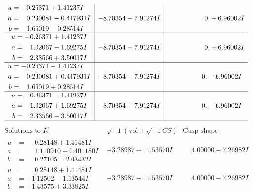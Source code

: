\documentclass[1p]{elsarticle_modified}
\theoremstyle{definition}
\newcommand{\I}{\sqrt{-1}}
\begin{document}
$$\begin{array}{c|c|c}
\begin{aligned}
u &= -0.26371 + 1.41237 I \\
a &= \phantom{-}0.230081 - 0.417931 I \\
b &= \phantom{-}1.66019 - 0.28514 I\end{aligned}
 & -8.70354 - 7.91274 I & \phantom{-0.000000 -}0. + 6.96002 I \\ \hline\begin{aligned}
u &= -0.26371 + 1.41237 I \\
a &= \phantom{-}1.02067 - 1.69275 I \\
b &= \phantom{-}2.33566 + 3.50017 I\end{aligned}
 & -8.70354 - 7.91274 I & \phantom{-0.000000 -}0. + 6.96002 I \\ \hline\begin{aligned}
u &= -0.26371 - 1.41237 I \\
a &= \phantom{-}0.230081 + 0.417931 I \\
b &= \phantom{-}1.66019 + 0.28514 I\end{aligned}
 & -8.70354 + 7.91274 I & \phantom{-0.000000 } 0. - 6.96002 I \\ \hline\begin{aligned}
u &= -0.26371 - 1.41237 I \\
a &= \phantom{-}1.02067 + 1.69275 I \\
b &= \phantom{-}2.33566 - 3.50017 I\end{aligned}
 & -8.70354 + 7.91274 I & \phantom{-0.000000 } 0. - 6.96002 I\\
 \hline 
 \end{array}$$\newpage$$\begin{array}{c|c|c}  
\text{Solutions to }I^u_{2}& \I (\text{vol} + \sqrt{-1}CS) & \text{Cusp shape}\\
 \hline 
\begin{aligned}
u &= \phantom{-}0.28148 + 1.41481 I \\
a &= \phantom{-}1.110910 + 0.401180 I \\
b &= \phantom{-}0.27105 - 2.03432 I\end{aligned}
 & -3.28987 + 11.53570 I & \phantom{-}4.00000 - 7.26982 I \\ \hline\begin{aligned}
u &= \phantom{-}0.28148 + 1.41481 I \\
a &= -1.12502 - 1.13544 I \\
b &= -1.43575 + 3.33825 I\end{aligned}
 & -3.28987 + 11.53570 I & \phantom{-}4.00000 - 7.26982 I \\ \hline\begin{aligned}

\end{aligned}
\end{array}$$
\end{document}
